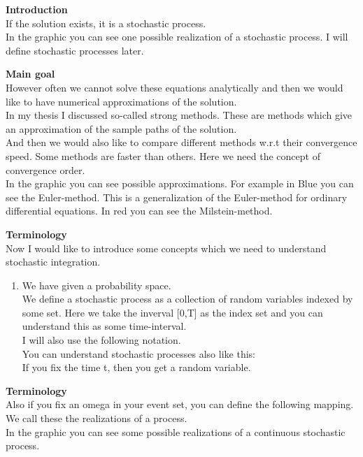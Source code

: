 \documentclass[10pt,a4paper,titlepage, openany]{memoir} %
\begin{document}
\newpage

\textbf{Introduction}\\
If the solution exists, it is a stochastic process.\\
In the graphic you can see one possible realization of a stochastic process. I will define stochastic processes later.


\textbf{Main goal}\\
However often we cannot solve these equations analytically and then we would like to have numerical approximations of the solution.\\
In my thesis I discussed so-called strong methods. These are methods which give an approximation of the sample paths of the solution.\\
And then we would also like to compare different methods w.r.t their convergence speed. Some methods are faster than others. Here we need the concept of convergence order.\\
In the graphic you can see possible approximations. For example in Blue you can see the Euler-method. This is a generalization of the Euler-method for ordinary differential equations. In red you can see the Milstein-method.



\textbf{Terminology}\\
Now I would like to introduce some concepts which we need to understand stochastic integration.
\begin{enumerate}
\item We have given a probability space.\\
We define a stochastic process as a collection of random variables indexed by some set. Here we take the inverval [0,T] as the index set and you can understand this as some time-interval.\\
I will also use the following notation.\\
You can understand stochastic processes also like this:\\
If you fix the time t, then you get a random variable.
\end{enumerate}

\textbf{Terminology}\\
Also if you fix an omega in your event set, you can define the following mapping.\\
We call these the realizations of a process.\\
In the graphic you can see some possible realizations of a continuous stochastic process.
\end{document}
